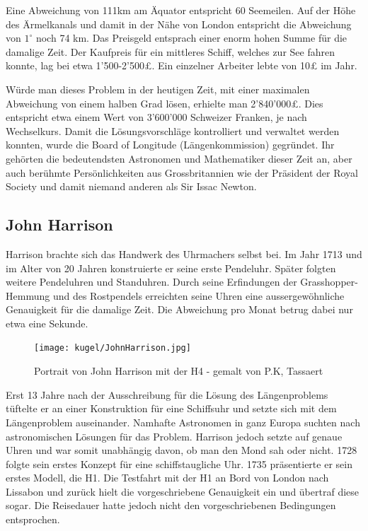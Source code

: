 \begin{refsection}
Eine Abweichung von 111km am Äquator entspricht 60 Seemeilen.
Auf der Höhe des Ärmelkanals und damit in der Nähe von London entspricht die Abweichung von $1 ^{\circ}$ noch 74 km.
Das Preisgeld entsprach einer enorm hohen Summe für die damalige Zeit. Der Kaufpreis für ein mittleres Schiff, welches zur See fahren konnte, lag bei etwa 1’500-2’500£. Ein einzelner Arbeiter lebte von 10£ im Jahr.

Würde man dieses Problem in der heutigen Zeit, mit einer maximalen Abweichung von einem halben Grad lösen, erhielte man 2’840’000£. Dies entspricht etwa einem Wert von 3’600’000 Schweizer Franken, je nach Wechselkurs.
Damit die Lösungsvorschläge kontrolliert und verwaltet werden konnten, wurde die Board of Longitude (Längenkommission) gegründet. Ihr gehörten die bedeutendsten Astronomen und Mathematiker dieser Zeit an, aber auch berühmte Persönlichkeiten aus Grossbritannien wie der Präsident der Royal Society und damit niemand anderen als Sir Issac Newton.



\subsection{John Harrison}
Harrison brachte sich das Handwerk des Uhrmachers selbst bei. Im Jahr 1713 und im Alter von 20 Jahren konstruierte er seine erste Pendeluhr. Später folgten weitere Pendeluhren und Standuhren. Durch seine Erfindungen der Grasshopper-Hemmung und des Rostpendels erreichten seine Uhren eine aussergewöhnliche Genauigkeit für die damalige Zeit. Die Abweichung pro Monat betrug dabei nur etwa eine Sekunde.

\begin{figure}[htbp]
\centering
\texttt{[image: kugel/JohnHarrison.jpg]}
\caption{Portrait von John Harrison mit der H4 - gemalt von P.K, Tassaert}
\end{figure}

Erst 13 Jahre nach der Ausschreibung für die Lösung des Längenproblems tüftelte er an einer Konstruktion für eine Schiffsuhr und setzte sich mit dem Längenproblem auseinander.
Namhafte Astronomen in ganz Europa suchten nach astronomischen Lösungen für das Problem. Harrison jedoch setzte auf genaue Uhren und war somit unabhängig davon, ob man den Mond sah oder nicht.
1728 folgte sein erstes Konzept für eine schiffstaugliche Uhr. 1735 präsentierte er sein erstes Modell, die H1. Die Testfahrt mit der H1 an Bord von London nach Lissabon und zurück hielt die vorgeschriebene Genauigkeit ein und übertraf diese sogar. Die Reisedauer hatte jedoch nicht den vorgeschriebenen Bedingungen entsprochen.


\end{refsection}

